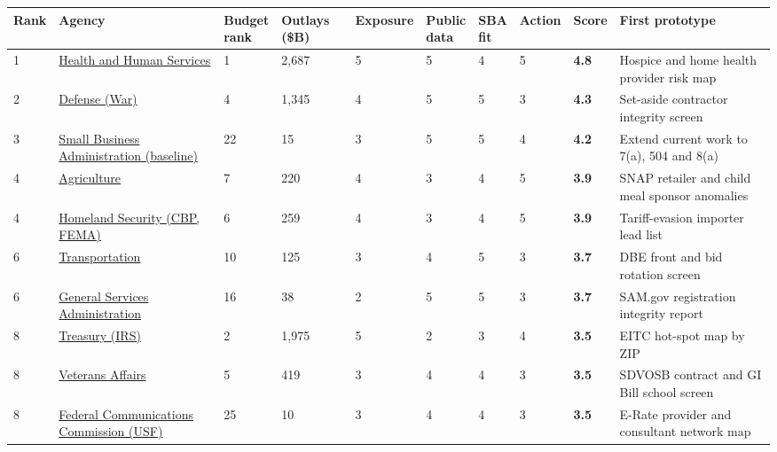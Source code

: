 \documentclass[letterpaper,11pt]{article}
\begin{document}
\begingroup\footnotesize\setlength{\tabcolsep}{4pt}\renewcommand{\arraystretch}{1.25}
\begin{longtable}[l]{@{}l>{\raggedright\arraybackslash}p{}lllllll>{\raggedright\arraybackslash}p{}@{}}
\rowcolor{coolblack}\leavevmode\color{white}\bfseries Rank & \leavevmode\color{white}\bfseries Agency & \leavevmode\color{white}\bfseries \makecell[tl]{Budget\\rank} & \leavevmode\color{white}\bfseries \makecell[tl]{Outlays\\(\$B)} & \leavevmode\color{white}\bfseries Exposure & \leavevmode\color{white}\bfseries \makecell[tl]{Public\\data} & \leavevmode\color{white}\bfseries \makecell[tl]{SBA\\fit} & \leavevmode\color{white}\bfseries Action & \leavevmode\color{white}\bfseries Score & \leavevmode\color{white}\bfseries First prototype \\
\endhead
1 & \href{hhs.pdf}{Health and Human Services} & 1 & 2,687 & 5 & 5 & 4 & 5 & \textbf{4.8} & Hospice and home health provider risk map \\
2 & \href{dod.pdf}{Defense (War)} & 4 & 1,345 & 4 & 5 & 5 & 3 & \textbf{4.3} & Set-aside contractor integrity screen \\
3 & \href{sba.pdf}{Small Business Administration (baseline)} & 22 & 15 & 3 & 5 & 5 & 4 & \textbf{4.2} & Extend current work to 7(a), 504 and 8(a) \\
4 & \href{usda.pdf}{Agriculture} & 7 & 220 & 4 & 3 & 4 & 5 & \textbf{3.9} & SNAP retailer and child meal sponsor anomalies \\
4 & \href{dhs.pdf}{Homeland Security (CBP, FEMA)} & 6 & 259 & 4 & 3 & 4 & 5 & \textbf{3.9} & Tariff-evasion importer lead list \\
6 & \href{dot.pdf}{Transportation} & 10 & 125 & 3 & 4 & 5 & 3 & \textbf{3.7} & DBE front and bid rotation screen \\
6 & \href{gsa.pdf}{General Services Administration} & 16 & 38 & 2 & 5 & 5 & 3 & \textbf{3.7} & SAM.gov registration integrity report \\
8 & \href{treasury.pdf}{Treasury (IRS)} & 2 & 1,975 & 5 & 2 & 3 & 4 & \textbf{3.5} & EITC hot-spot map by ZIP \\
8 & \href{va.pdf}{Veterans Affairs} & 5 & 419 & 3 & 4 & 4 & 3 & \textbf{3.5} & SDVOSB contract and GI Bill school screen \\
8 & \href{fcc.pdf}{Federal Communications Commission (USF)} & 25 & 10 & 3 & 4 & 4 & 3 & \textbf{3.5} & E-Rate provider and consultant network map \\

\end{longtable}
\end{document}
